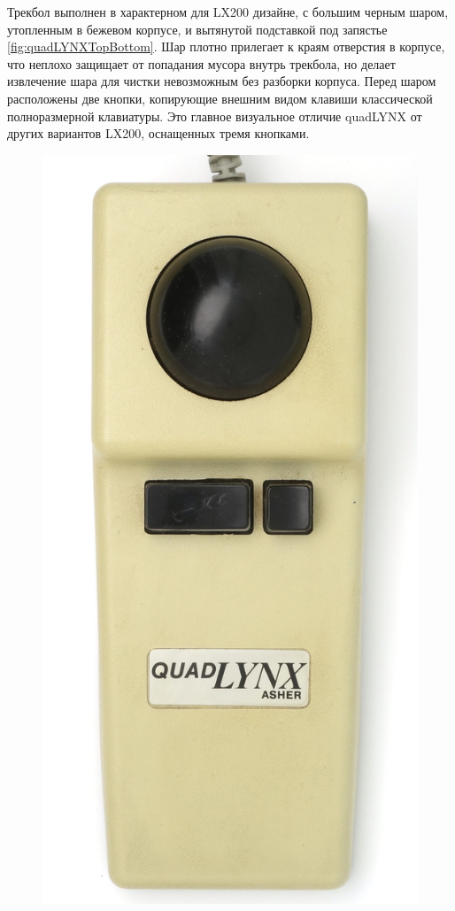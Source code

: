 \documentclass[11pt, a4paper]{article}
\begin{document}
Трекбол выполнен в характерном для LX200 дизайне, с большим черным шаром, утопленным в бежевом корпусе, и вытянутой подставкой под запястье \ref{fig:quadLYNXTopBottom}. Шар плотно прилегает к краям отверстия в корпусе, что неплохо защищает от попадания мусора внутрь трекбола, но делает извлечение шара для чистки невозможным без разборки корпуса. Перед шаром расположены две кнопки, копирующие внешним видом клавиши классической полноразмерной клавиатуры. Это главное визуальное отличие quadLYNX от других вариантов LX200, оснащенных тремя кнопками.

\begin{figure}[h]
    \centering
    \includegraphics[scale=0.41]{1986_honeywell_asher_quadlynx_trackball/top_30.jpg}

\end{figure}
\end{document}
